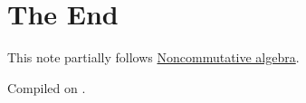 \documentclass{article}
\begin{document}
\section*{The End}

This note partially follows \href{https://ocw.mit.edu/courses/18-706-noncommutative-algebra-spring-2023/mit18_706_s23_full_lec.pdf}{Noncommutative algebra}.

\noindent Compiled on \todayymd.

\noindent\home
\end{document}
